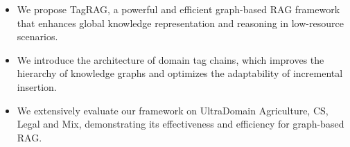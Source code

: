 \documentclass[11pt]{article}
\begin{document}
\begin{itemize}
    \item We propose TagRAG, a powerful and efficient graph-based RAG framework that enhances global knowledge representation and reasoning in low-resource scenarios.
    \item We introduce the architecture of domain tag chains, which improves the hierarchy of knowledge graphs and optimizes the adaptability of incremental insertion.
    \item We extensively evaluate our framework on UltraDomain Agriculture, CS, Legal and Mix, demonstrating its effectiveness and efficiency for graph-based RAG.
\end{itemize}










    
\end{document}
